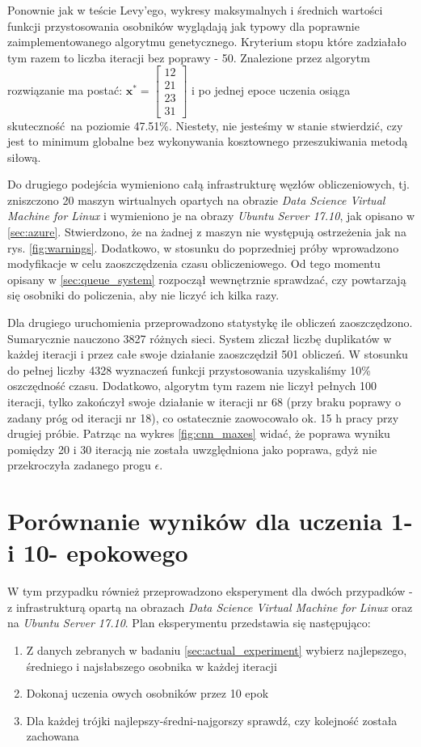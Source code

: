 Ponownie jak w teście Levy'ego, wykresy maksymalnych i średnich wartości funkcji przystosowania osobników wyglądają jak typowy dla poprawnie zaimplementowanego algorytmu genetycznego.
Kryterium stopu które zadziałało tym razem to liczba iteracji bez poprawy - 50.
Znalezione przez algorytm rozwiązanie ma postać: $\mathbf{x^*} = \begin{bmatrix}12 \\ 21 \\ 23 \\ 31\end{bmatrix}$ i po jednej epoce uczenia osiąga skuteczność na poziomie 47.51\%.
Niestety, nie jesteśmy w stanie stwierdzić, czy jest to minimum globalne bez wykonywania kosztownego przeszukiwania metodą siłową.

Do drugiego podejścia wymieniono całą infrastrukturę węzłów obliczeniowych, tj. zniszczono 20 maszyn wirtualnych opartych na obrazie \textit{Data Science Virtual Machine for Linux} i wymieniono je na obrazy \textit{Ubuntu Server 17.10}, jak opisano w \ref{sec:azure}.
Stwierdzono, że na żadnej z maszyn nie występują ostrzeżenia jak na rys. \ref{fig:warnings}.
Dodatkowo, w stosunku do poprzedniej próby wprowadzono modyfikacje w celu zaoszczędzenia czasu obliczeniowego.
Od tego momentu opisany w \ref{sec:queue_system} rozpoczął wewnętrznie sprawdzać, czy powtarzają się osobniki do policzenia, aby nie liczyć ich kilka razy.

Dla drugiego uruchomienia przeprowadzono statystykę ile obliczeń zaoszczędzono.
Sumarycznie nauczono 3827 różnych sieci.
System zliczał liczbę duplikatów w każdej iteracji i przez całe swoje działanie zaoszczędził 501 obliczeń.
W stosunku do pełnej liczby 4328 wyznaczeń funkcji przystosowania uzyskaliśmy 10\% oszczędność czasu.
Dodatkowo, algorytm tym razem nie liczył pełnych 100 iteracji, tylko zakończył swoje działanie w iteracji nr 68 (przy braku poprawy o zadany próg od iteracji nr 18), co ostatecznie zaowocowało ok. 15 h pracy przy drugiej próbie.
Patrząc na wykres \ref{fig:cnn_maxes} widać, że poprawa wyniku pomiędzy 20 i 30 iteracją nie została uwzględniona jako poprawa, gdyż nie przekroczyła zadanego progu $\epsilon$.

\section{Porównanie wyników dla uczenia 1- i 10- epokowego}\label{sec:thesis_proof}
W tym przypadku również przeprowadzono eksperyment dla dwóch przypadków - z infrastrukturą opartą na obrazach \textit{Data Science Virtual Machine for Linux} oraz na \textit{Ubuntu Server 17.10}.
Plan eksperymentu przedstawia się następująco:
\begin{enumerate}
  \item Z danych zebranych w badaniu \ref{sec:actual_experiment} wybierz najlepszego, średniego i najsłabszego osobnika w każdej iteracji
  \item Dokonaj uczenia owych osobników przez 10 epok
  \item Dla każdej trójki najlepszy-średni-najgorszy sprawdź, czy kolejność została zachowana
\end{enumerate}

